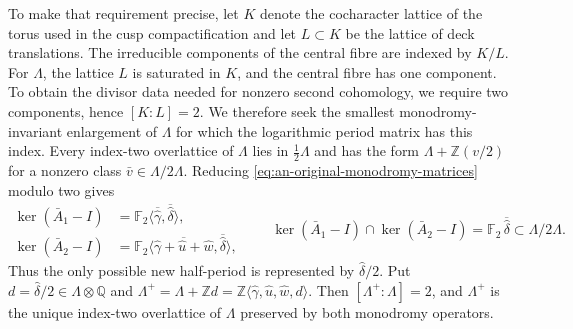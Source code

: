 \documentclass[11pt]{article}
\theoremstyle{definition}
\theoremstyle{remark}
\numberwithin{equation}{section}
\newcommand{\ZZ}{\mathbb Z}
\begin{document}
To make that requirement precise, let $K$ denote the cocharacter lattice
of the torus used in the cusp compactification and let $L\subset K$ be the
lattice of deck translations.  The irreducible components of the central
fibre are indexed by $K/L$.  For $\Lambda$, the lattice $L$ is
saturated in $K$, and the central fibre has one component.  To obtain the
divisor data needed for nonzero second cohomology, we require two components,
hence $[K:L]=2$.  We therefore seek the smallest monodromy-invariant
enlargement of $\Lambda$ for which the logarithmic period matrix has this
index.  Every index-two overlattice of
$\Lambda$ lies in $\tfrac12\Lambda$ and has the form
$\Lambda+\mathbb Z(v/2)$ for a nonzero class
$\bar v\in\Lambda/2\Lambda$.  Reducing
\eqref{eq:an-original-monodromy-matrices} modulo two gives
\[
 \begin{aligned}
 \ker(\bar A_1-I)
  &=\mathbb F_2\langle\overline{\widehat\gamma},
       \overline{\widehat\delta}\rangle,\\
 \ker(\bar A_2-I)
  &=\mathbb F_2\langle
       \overline{\widehat\gamma+\widehat u+\widehat w},
       \overline{\widehat\delta}\rangle,
 \end{aligned}
 \qquad
 \ker(\bar A_1-I)\cap\ker(\bar A_2-I)
 =\mathbb F_2\,\overline{\widehat\delta}
 \subset\Lambda/2\Lambda.
\]
Thus the only possible new half-period is represented by
$\widehat\delta/2$.  Put
$d=\widehat\delta/2\in\Lambda\otimes\mathbb Q$ and
$\Lambda^+=\Lambda+\ZZ d
=\ZZ\langle\widehat\gamma,\widehat u,\widehat w,d\rangle$.
Then $[\Lambda^+:\Lambda]=2$, and $\Lambda^+$ is the unique index-two
overlattice of $\Lambda$ preserved by both monodromy operators.
\end{document}
